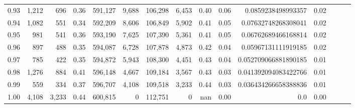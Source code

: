 \begin{tabular}{rrrrrrrrrrrrrrr}
0.93 &   1,212 &    696 &  0.36 &  591,127 &    9,688 &  106,298 &    6,453 &  0.40 &  0.06 &    0.0859238498993357 &      0.02 \\
0.94 &   1,082 &    551 &  0.34 &  592,209 &    8,606 &  106,849 &    5,902 &  0.41 &  0.05 &   0.07632748268308041 &      0.02 \\
0.95 &     981 &    541 &  0.36 &  593,190 &    7,625 &  107,390 &    5,361 &  0.41 &  0.05 &   0.06762689466168814 &      0.02 \\
0.96 &     897 &    488 &  0.35 &  594,087 &    6,728 &  107,878 &    4,873 &  0.42 &  0.04 &   0.05967131111919185 &      0.02 \\
0.97 &     785 &    422 &  0.35 &  594,872 &    5,943 &  108,300 &    4,451 &  0.43 &  0.04 &  0.052709066881890185 &      0.01 \\
0.98 &   1,276 &    884 &  0.41 &  596,148 &    4,667 &  109,184 &    3,567 &  0.43 &  0.03 &  0.041392094083422766 &      0.01 \\
0.99 &     559 &    334 &  0.37 &  596,707 &    4,108 &  109,518 &    3,233 &  0.44 &  0.03 &  0.036434266658388836 &      0.01 \\
1.00 &   4,108 &  3,233 &  0.44 &  600,815 &        0 &  112,751 &        0 &   nan &  0.00 &                   0.0 &      0.00 \\
\bottomrule
\end{tabular}
